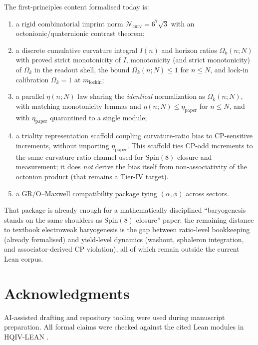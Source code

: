 \documentclass[11pt]{amsart}
\begin{document}
The first-principles content formalised today is:
\begin{enumerate}
\item a rigid combinatorial imprint norm \(\mathcal{N}_{\mathrm{curv}}=6^7\sqrt{3}\) with an octonionic/quaternionic contrast theorem;
\item a discrete cumulative curvature integral \(I(n)\) and horizon ratios \(\Omega_k(n;N)\) with proved strict monotonicity of \(I\), monotonicity (and strict monotonicity) of \(\Omega_k\) in the readout shell, the bound \(\Omega_k(n;N)\le 1\) for \(n\le N\), and lock-in calibration \(\Omega_k=1\) at \(m_{\mathrm{lockin}}\);
\item a parallel \(\eta(n;N)\) law sharing the \emph{identical} normalization as \(\Omega_k(n;N)\), with matching monotonicity lemmas and \(\eta(n;N)\le \eta_{\mathrm{paper}}\) for \(n\le N\), and with \(\eta_{\mathrm{paper}}\) quarantined to a single module;
\item a triality representation scaffold coupling curvature-ratio bias to CP-sensitive increments, without importing \(\eta_{\mathrm{paper}}\).
  This scaffold ties CP-odd increments to the same curvature-ratio channel used for \(\mathrm{Spin}(8)\) closure and measurement; it does \emph{not} derive the bias itself from non-associativity of the octonion product (that remains a Tier-IV target).
\item a GR/O--Maxwell compatibility package tying \((\alpha,\phi)\) across sectors.
\end{enumerate}
That package is already enough for a mathematically disciplined ``baryogenesis stands on the same shoulders as \(\mathrm{Spin}(8)\) closure'' paper; the remaining distance to textbook electroweak baryogenesis is the gap between ratio-level bookkeeping (already formalised) and yield-level dynamics (washout, sphaleron integration, and associator-derived CP violation), all of which remain outside the current Lean corpus.

\section*{Acknowledgments}
AI-assisted drafting and repository tooling were used during manuscript preparation. All formal claims were checked against the cited Lean modules in HQIV-LEAN \cite{hqiv-lean}.
\end{document}
